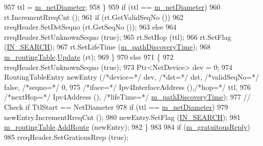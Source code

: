 \begin{DoxyCode}
957             ttl = \hyperlink{classns3_1_1aodv_1_1RoutingProtocol_a563c2234b89a44628f8e71b38e7c60ec}{m\_netDiameter};
958         \}
959       \textcolor{keywordflow}{if} (ttl == \hyperlink{classns3_1_1aodv_1_1RoutingProtocol_a563c2234b89a44628f8e71b38e7c60ec}{m\_netDiameter})
960         rt.IncrementRreqCnt ();
961       \textcolor{keywordflow}{if} (rt.GetValidSeqNo ())
962         rreqHeader.SetDstSeqno (rt.GetSeqNo ());
963       \textcolor{keywordflow}{else}
964         rreqHeader.SetUnknownSeqno (\textcolor{keyword}{true});
965       rt.SetHop (ttl);
966       rt.SetFlag (\hyperlink{group__aodv_gga44216921a9c725a5ab8bc19059052a26aba44cda5a5df371b6567f70d7d8311fa}{IN\_SEARCH});
967       rt.SetLifeTime (\hyperlink{classns3_1_1aodv_1_1RoutingProtocol_a491c2fe5559a8153343df590999b468f}{m\_pathDiscoveryTime});
968       \hyperlink{classns3_1_1aodv_1_1RoutingProtocol_a4e1003a34c8adc96db71096d88c98ae0}{m\_routingTable}.\hyperlink{classns3_1_1aodv_1_1RoutingTable_a39fb5335110164f4c1b97682a3812dc1}{Update} (rt);
969     \}
970   \textcolor{keywordflow}{else}
971     \{
972       rreqHeader.SetUnknownSeqno (\textcolor{keyword}{true});
973       Ptr<NetDevice> dev = 0;
974       RoutingTableEntry newEntry (\textcolor{comment}{/*device=*/} dev, \textcolor{comment}{/*dst=*/} dst, \textcolor{comment}{/*validSeqNo=*/} \textcolor{keyword}{false}, \textcolor{comment}{/*seqno=*/} 0,
975                                               \textcolor{comment}{/*iface=*/} Ipv4InterfaceAddress (),\textcolor{comment}{/*hop=*/} ttl,
976                                               \textcolor{comment}{/*nextHop=*/} Ipv4Address (), \textcolor{comment}{/*lifeTime=*/} 
      \hyperlink{classns3_1_1aodv_1_1RoutingProtocol_a491c2fe5559a8153343df590999b468f}{m\_pathDiscoveryTime});
977       \textcolor{comment}{// Check if TtlStart == NetDiameter}
978       \textcolor{keywordflow}{if} (ttl == \hyperlink{classns3_1_1aodv_1_1RoutingProtocol_a563c2234b89a44628f8e71b38e7c60ec}{m\_netDiameter})
979         newEntry.IncrementRreqCnt ();
980       newEntry.SetFlag (\hyperlink{group__aodv_gga44216921a9c725a5ab8bc19059052a26aba44cda5a5df371b6567f70d7d8311fa}{IN\_SEARCH});
981       \hyperlink{classns3_1_1aodv_1_1RoutingProtocol_a4e1003a34c8adc96db71096d88c98ae0}{m\_routingTable}.\hyperlink{classns3_1_1aodv_1_1RoutingTable_a579e562e38e67d510de1ff2c87806c76}{AddRoute} (newEntry);
982     \}
983 
984   \textcolor{keywordflow}{if} (\hyperlink{classns3_1_1aodv_1_1RoutingProtocol_a492b1b69b8f91b56ba3301006318a4f3}{m\_gratuitousReply})
985     rreqHeader.SetGratiousRrep (\textcolor{keyword}{true});

\end{DoxyCode}
